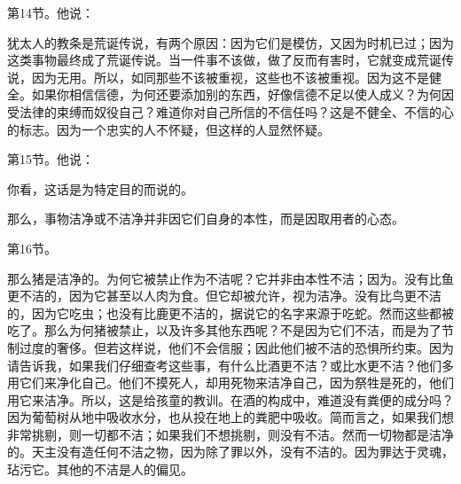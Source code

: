 第14节。他说：\par

犹太人的教条是荒诞传说，有两个原因：因为它们是模仿，又因为时机已过；因为这类事物最终成了荒诞传说。当一件事不该做，做了反而有害时，它就变成荒诞传说，因为无用。所以，如同那些不该被重视，这些也不该被重视。因为这不是健全。如果你相信信德，为何还要添加别的东西，好像信德不足以使人成义？为何因受法律的束缚而奴役自己？难道你对自己所信的不信任吗？这是不健全、不信的心的标志。因为一个忠实的人不怀疑，但这样的人显然怀疑。\par

第15节。他说：\par

你看，这话是为特定目的而说的。\par

\par

那么，事物洁净或不洁净并非因它们自身的本性，而是因取用者的心态。\par

\par

第16节。\par

那么猪是洁净的。为何它被禁止作为不洁呢？它并非由本性不洁；因为。没有比鱼更不洁的，因为它甚至以人肉为食。但它却被允许，视为洁净。没有比鸟更不洁的，因为它吃虫；也没有比鹿更不洁的，据说它的名字来源于吃蛇。然而这些都被吃了。那么为何猪被禁止，以及许多其他东西呢？不是因为它们不洁，而是为了节制过度的奢侈。但若这样说，他们不会信服；因此他们被不洁的恐惧所约束。因为请告诉我，如果我们仔细查考这些事，有什么比酒更不洁？或比水更不洁？他们多用它们来净化自己。他们不摸死人，却用死物来洁净自己，因为祭牲是死的，他们用它来洁净。所以，这是给孩童的教训。在酒的构成中，难道没有粪便的成分吗？因为葡萄树从地中吸收水分，也从投在地上的粪肥中吸收。简而言之，如果我们想非常挑剔，则一切都不洁；如果我们不想挑剔，则没有不洁。然而一切物都是洁净的。天主没有造任何不洁之物，因为除了罪以外，没有不洁的。因为罪达于灵魂，玷污它。其他的不洁是人的偏见。\par

\par

